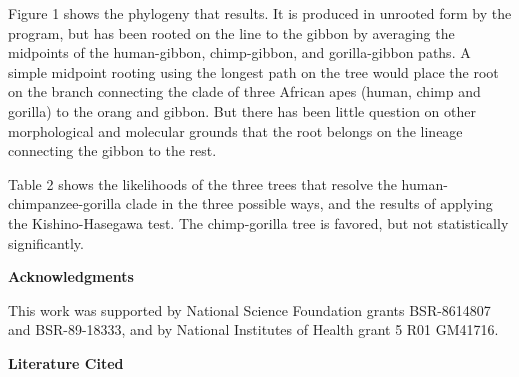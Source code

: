 Figure 1 shows the phylogeny that results.  It is produced in unrooted
form by the program, but has been rooted on the line to the gibbon by
averaging the midpoints of the human-gibbon, chimp-gibbon, and
gorilla-gibbon paths.  A simple midpoint rooting using the longest
path on the tree would place the root on the branch connecting the clade of
three African apes (human, chimp and gorilla) to the orang and gibbon.
But there has been little question on other morphological and molecular
grounds that the root belongs on the lineage
connecting the gibbon to the rest.

Table 2 shows the likelihoods of the three trees that resolve the
human-chimpanzee-gorilla clade in the three possible ways, and the
results of applying the Kishino-Hasegawa test.  The chimp-gorilla
tree is favored, but not statistically significantly.


\bigskip

\centerline{\bf Acknowledgments}

This work was supported by National Science Foundation grants BSR-8614807 and
BSR-89-18333, and by National Institutes of Health grant 5 R01 GM41716.


\newpage


\centerline{\bf Literature Cited}
\medskip

